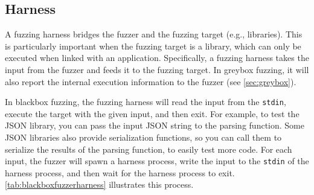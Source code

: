 \documentclass[letterpaper,11pt]{article}
\begin{document}





\subsection{Harness}





A fuzzing harness bridges the fuzzer and the fuzzing target (e.g., libraries). This is particularly important when the fuzzing target is a library, which can only be executed when linked with an application.
Specifically, a fuzzing harness takes the input from the fuzzer and feeds it to the fuzzing target.
In greybox fuzzing, it will also report the internal execution information to the fuzzer (see \autoref{sec:greybox}).

In blackbox fuzzing, the fuzzing harness will read the input from the \texttt{stdin}, execute the target with the given input, and then exit.
For example, to test the JSON library, you can pass the input JSON string to the parsing function.
Some JSON libraries also provide serialization functions, so you can call them to serialize the results of the parsing function, to easily test more code.
For each input, the fuzzer will spawn a harness process, write the input to the \texttt{stdin} of the harness process, and then wait for the harness process to exit.
\autoref{tab:blackboxfuzzerharness} illustrates this process.
\end{document}
